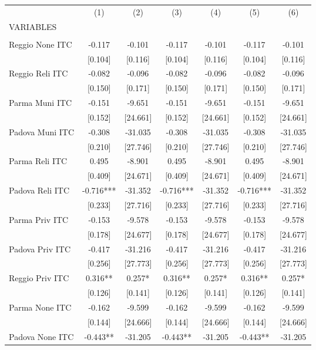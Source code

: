 \begin{tabular}{lcccccc} \hline
 & (1) & (2) & (3) & (4) & (5) & (6) \\
VARIABLES &  &  &  &  &  &  \\ \hline
 &  &  &  &  &  &  \\
Reggio None ITC & -0.117 & -0.101 & -0.117 & -0.101 & -0.117 & -0.101 \\
 & [0.104] & [0.116] & [0.104] & [0.116] & [0.104] & [0.116] \\
Reggio Reli ITC & -0.082 & -0.096 & -0.082 & -0.096 & -0.082 & -0.096 \\
 & [0.150] & [0.171] & [0.150] & [0.171] & [0.150] & [0.171] \\
Parma Muni ITC & -0.151 & -9.651 & -0.151 & -9.651 & -0.151 & -9.651 \\
 & [0.152] & [24.661] & [0.152] & [24.661] & [0.152] & [24.661] \\
Padova Muni ITC & -0.308 & -31.035 & -0.308 & -31.035 & -0.308 & -31.035 \\
 & [0.210] & [27.746] & [0.210] & [27.746] & [0.210] & [27.746] \\
Parma Reli ITC & 0.495 & -8.901 & 0.495 & -8.901 & 0.495 & -8.901 \\
 & [0.409] & [24.671] & [0.409] & [24.671] & [0.409] & [24.671] \\
Padova Reli ITC & -0.716*** & -31.352 & -0.716*** & -31.352 & -0.716*** & -31.352 \\
 & [0.233] & [27.716] & [0.233] & [27.716] & [0.233] & [27.716] \\
Parma Priv ITC & -0.153 & -9.578 & -0.153 & -9.578 & -0.153 & -9.578 \\
 & [0.178] & [24.677] & [0.178] & [24.677] & [0.178] & [24.677] \\
Padova Priv ITC & -0.417 & -31.216 & -0.417 & -31.216 & -0.417 & -31.216 \\
 & [0.256] & [27.773] & [0.256] & [27.773] & [0.256] & [27.773] \\
Reggio Priv ITC & 0.316** & 0.257* & 0.316** & 0.257* & 0.316** & 0.257* \\
 & [0.126] & [0.141] & [0.126] & [0.141] & [0.126] & [0.141] \\
Parma None ITC & -0.162 & -9.599 & -0.162 & -9.599 & -0.162 & -9.599 \\
 & [0.144] & [24.666] & [0.144] & [24.666] & [0.144] & [24.666] \\
Padova None ITC & -0.443** & -31.205 & -0.443** & -31.205 & -0.443** & -31.205 \\

\end{tabular}
